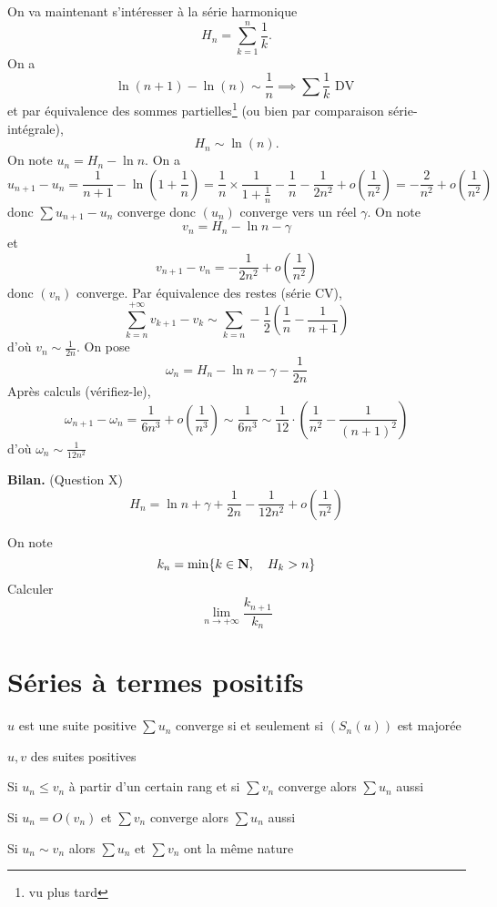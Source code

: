 On va maintenant s'intéresser à la série harmonique \[
    H_n=\sum_{k=1}^n\frac1k.
\]
On a \[
    \ln(n+1)-\ln (n)\sim \frac1n \implies \sum\frac1k \text{ DV }
\]
et par équivalence des sommes partielles\footnote{vu plus tard} (ou bien par comparaison série-intégrale), \[
    H_n\sim\ln(n).
\]
On note $u_n=H_n-\ln n$. On a \[
    u_{n+1}-u_n=\frac1{n+1}-\ln \left( 1+\frac1n \right)=\frac1n\times \frac1{1+\frac1n}-\frac1n-\frac1{2n^2}+o \left( \frac1{n^2} \right)=-\frac2{n^2}+o \left( \frac1{n^2} \right)
\]
donc $\sum u_{n+1}-u_n$ converge donc $(u_n)$ converge vers un réel $\gamma$. On note \[
    v_n=H_n-\ln n-\gamma
\]
et \[
    v_{n+1}-v_n=-\frac1{2n^2}+o \left( \frac1{n^2} \right)
\]
donc $(v_n)$ converge. Par équivalence des restes (série CV), \[
    \sum_{k=n}^{+\infty}v_{k+1}-v_k\sim\sum_{k=n} -\frac12 \left( \frac1n-\frac1{n+1} \right)
\]
d'où $v_n\sim \frac1{2n}$.
On pose \[
    \omega_n=H_n-\ln n-\gamma-\frac1{2n}
\]
Après calculs (vérifiez-le), \[
    \omega_{n+1}-\omega_n=\frac1{6n^3}+o \left( \frac1{n^3} \right)\sim\frac1{6n^3}\sim\frac1{12}\cdot \left( \frac 1{n^2}-\frac1{(n+1)^2} \right)
\]
d'où $\omega_n\sim\frac1{12n^2}$

\textbf{Bilan.} (Question X) \[
    H_n=\ln n+\gamma+\frac1{2n}-\frac1{12n^2}+o \left( \frac1{n^2} \right)
\]

\begin{exo}
    On note \[
        k_n=\min\{k\in\mathbf N, \quad H_k>n\}
    \]
    Calculer \[
        \lim_{n\to+\infty}\frac{k_{n+1}}{k_n}
    \]
\end{exo}

\section{Séries à termes positifs}

\begin{prop}
    \Hyp $u$ est une suite positive
    \Conc $\sum u_n$ converge si et seulement si $(S_n(u))$ est majorée
\end{prop}

\begin{prop}
    \Hyp $u, v$ des suites positives
    \begin{concenum}
    \item Si $u_n\leq v_n$ à partir d'un certain rang et si $\sum v_n$ converge alors $\sum u_n$ aussi
    \item Si $u_n=O(v_n)$ et $\sum v_n$ converge alors $\sum u_n$ aussi
    \item Si $u_n\sim v_n$ alors $\sum u_n$ et $\sum v_n$ ont la même nature
    \end{concenum}
\end{prop}

